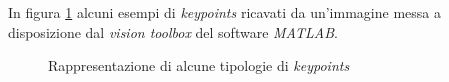 In figura \ref{fig:keypoints} alcuni esempi di \textit{keypoints} ricavati da un'immagine messa a disposizione dal \textit{vision toolbox} del software \textit{MATLAB}.
\begin{figure}[H]
	\centering
	\caption[Rappresentazione di alcune tipologie di \textit{keypoints}]{Rappresentazione di alcune tipologie di \textit{keypoints}\protect\footnotemark} \label{fig:keypoints}
\end{figure}

